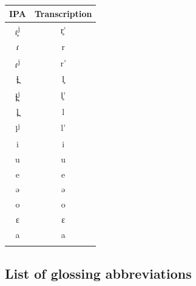\documentclass[a4paper, 12pt]{article}
\begin{document}
\hfill
\begin{minipage}[t]{.3\linewidth}
\begin{table}[H]
\begin{tabular}{cc}
\toprule
IPA        & Transcription \\
\bottomrule
ɾ̥\textsuperscript{j}        & r̥'                     \\
ɾ          & r                       \\
ɾ\textsuperscript{j}         & r'                      \\
ɬ̪         & l̥                      \\
ɬ̪\textsuperscript{j}        & l̥'                     \\
l̪         & l                       \\
l\textsuperscript{j}        & l'                      \\
i          & i                       \\
u          & u                       \\
e          & e                       \\
ə          & ə                       \\
o          & o                       \\
ɛ          & ɛ                       \\
a          & a                      \\
\addlinespace[0.065cm]
\bottomrule
\end{tabular}
\end{table}
\end{minipage}	

			\subsection*{List of glossing abbreviations \vspace*{-1.5em}}
			
\begin{multicols}{2}
\printglossary[title={}, style=mcolindex, nonumberlist]
\end{multicols}

\printbibliography
\end{document}
